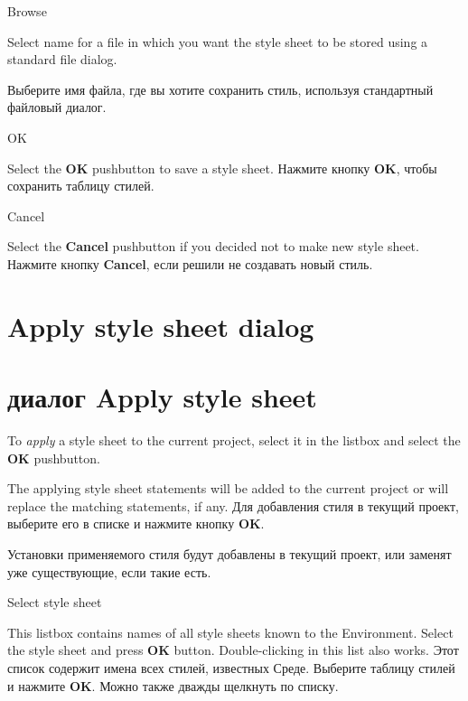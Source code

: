 \begin{popup}
\caption{Browse}

\ifenglish
Select name for a file in which you want the style sheet to be stored
using a standard file dialog.

\else
Выберите имя файла, где вы хотите сохранить стиль, используя стандартный 
файловый диалог.
\fi
\end{popup}

\begin{popup}
\caption{OK}

\ifenglish
Select the {\bf OK} pushbutton to save a style sheet.
\else
Нажмите кнопку {\bf OK}, чтобы сохранить таблицу стилей.
\fi
\end{popup}

\begin{popup}
\caption{Cancel}

\ifenglish
Select the {\bf Cancel} pushbutton if you decided not to make new style sheet.
\else
Нажмите кнопку {\bf Cancel}, если решили не создавать новый стиль.
\fi
\end{popup}


\ifenglish
\section{Apply style sheet dialog}
\else
\section{диалог Apply style sheet}
\fi
{}

\ifenglish
To {\em apply} a style sheet to the current project, select it in the
listbox and select the {\bf OK} pushbutton.

The applying style sheet statements will be added to the current
project or will replace the matching statements, if any.
\else
Для добавления стиля в текущий проект, выберите его в списке 
и нажмите кнопку {\bf OK}.

Установки применяемого стиля будут добавлены в текущий проект,
или заменят уже существующие, если такие есть.
\fi

\begin{popup}
\caption{Select style sheet}

\ifenglish
This listbox contains names of all style sheets known to the Environment.
Select the style sheet and press {\bf OK} button. Double-clicking in this list
also works.
\else
Этот список содержит имена всех стилей, известных Среде.
Выберите таблицу стилей и нажмите {\bf OK}. Можно также дважды щелкнуть по 
списку.
\fi
\end{popup}

